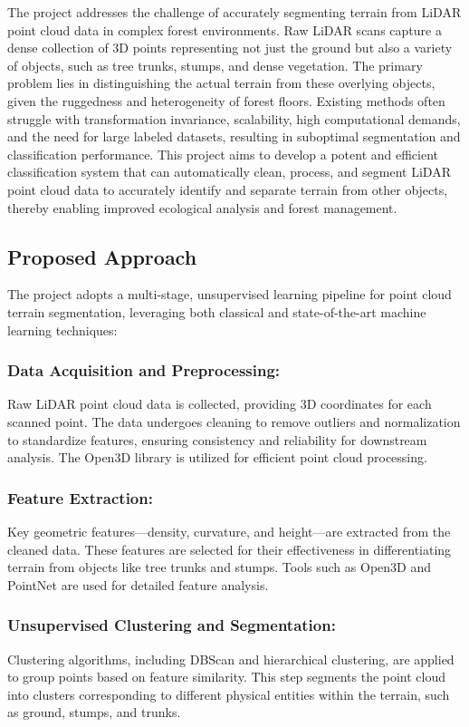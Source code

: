 \documentclass[../report.tex]{subfiles}
\begin{document}
The project addresses the challenge of accurately segmenting terrain from LiDAR point cloud data in complex forest environments. Raw LiDAR scans capture a dense collection of 3D points representing not just the ground but also a variety of objects, such as tree trunks, stumps, and dense vegetation. The primary problem lies in distinguishing the actual terrain from these overlying objects, given the ruggedness and heterogeneity of forest floors. Existing methods often struggle with transformation invariance, scalability, high computational demands, and the need for large labeled datasets, resulting in suboptimal segmentation and classification performance. This project aims to develop a potent and efficient classification system that can automatically clean, process, and segment LiDAR point cloud data to accurately identify and separate terrain from other objects, thereby enabling improved ecological analysis and forest management.
    \subsection{Proposed Approach}
    
    \label{sec:introduction:proposed_approach}
The project adopts a multi-stage, unsupervised learning pipeline for point cloud terrain segmentation, leveraging both classical and state-of-the-art machine learning techniques:
\subsubsection{Data Acquisition and Preprocessing:}
Raw LiDAR point cloud data is collected, providing 3D coordinates for each scanned point. The data undergoes cleaning to remove outliers and normalization to standardize features, ensuring consistency and reliability for downstream analysis. The Open3D library is utilized for efficient point cloud processing.
\subsubsection{Feature Extraction:}
Key geometric features—density, curvature, and height—are extracted from the cleaned data. These features are selected for their effectiveness in differentiating terrain from objects like tree trunks and stumps. Tools such as Open3D and PointNet are used for detailed feature analysis.\cite{Open3D_Library}\cite{PointNet}
\subsubsection{Unsupervised Clustering and Segmentation:}
Clustering algorithms, including DBScan and hierarchical clustering, are applied to group points based on feature similarity. This step segments the point cloud into clusters corresponding to different physical entities within the terrain, such as ground, stumps, and trunks.\cite{DBSCAN}\cite{DBSCan_Grammarly}
\end{document}

